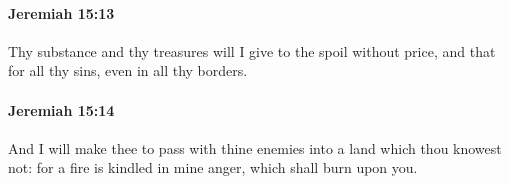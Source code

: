 		\paragraph{Jeremiah 15:13} %
			\label{JEREMIAH-15-13}

			Thy substance and thy treasures will I give to the spoil without price, and that for all thy sins, even in all thy borders.


		\paragraph{Jeremiah 15:14} %
			\label{JEREMIAH-15-14}

			And I will make thee to pass with thine enemies into a land which thou knowest not: for a fire is kindled in mine anger, which shall burn upon you.


